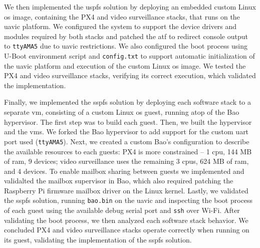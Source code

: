 We then implemented the \gls{uspfs} solution by deploying an embedded custom
Linux \gls{os} image, containing the PX4 and video surveillance stacks, that
runs on the \gls{uavic} platform. We configured the system to support the device
drivers and modules required by both stacks and patched the \gls{atf} to
redirect console output to \lstinline{ttyAMA5} due to \gls{uavic}
restrictions. We also configured the boot process using U-Boot environment
script and \lstinline{config.txt} to support automatic initialization of the
\gls{uavic} platform and execution of the custom Linux \gls{os} image. We tested
the PX4 and video surveillance stacks, verifying its correct execution, which
validated the implementation.

Finally, we implemented the \gls{sspfs} solution by deploying each software
stack to a separate \gls{vm}, consisting of a custom Linux \gls{os} guest, running
atop of the Bao hypervisor. The first step was to build each guest. Then, we
built the hypervisor and the \glspl{vm}. We forked the Bao hypervisor to add
support for the custom \gls{uart} port used (\lstinline{ttyAMA5}). Next, we
created a custom Bao's configuration to describe the available resources to each
guests: PX4 is more constrained -- 1 \gls{cpu}, 144 MB of \gls{ram}, 9 devices; video
surveillance uses the remaining 3 \glspl{cpu}, 624 MB of \gls{ram}, and 4
devices. To enable mailbox sharing between guests we implemented and validalted the mailbox
supervisor in Bao, which also required patching the Raspberry Pi firmware
mailbox driver on the Linux kernel. Lastly, we validated the \gls{sspfs}
solution, running \lstinline{bao.bin} on the \gls{uavic} and inspecting the boot
process of each guest using the available debug serial port and \texttt{ssh}
over Wi-Fi. After validating the boot process, we then analyzed each software
stack behavior. We concluded PX4 and video surveillance stacks operate correctly
when running on its guest, validating the implementation of the \gls{sspfs} solution.

